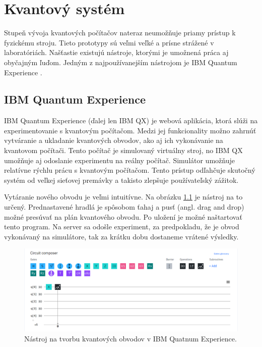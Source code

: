 
\chapter{Kvantový systém}

Stupeň vývoja kvantových počítačov nateraz neumožňuje priamy prístup k
fyzickému stroju. Tieto prototypy sú veľmi veľké a prísne strážené v 
laboratóriách. Našťastie existujú nástroje, ktorými je umožnená práca aj 
obyčajným ľuďom. Jedným z najpoužívanejším nástrojom je IBM Quantum Experience
\cite{IBM}. 

\section{IBM Quantum Experience}
IBM Quantum Experience (ďalej len IBM QX) je webová aplikácia, ktorá 
slúži na experimentovanie s kvantovým počítačom. Medzi jej funkcionality 
možno zahrnúť vytváranie a ukladanie kvantových obvodov, ako aj ich 
vykonávanie na kvantovom počítači. Tento počítač je simulovaný virtuálny 
stroj, no IBM QX umožňuje aj odoslanie experimentu na reálny počítač. 
Simulátor umožňuje relatívne rýchlu prácu s kvantovým počítačom. Tento
prístup odľahčuje skutočný systém od veľkej sieťovej premávky a takisto 
zlepšuje používateľský zážitok.

Vytáranie nového obvodu je veľmi intuitívne. Na obrázku \ref{ibm_qx_composer}
je nástroj na to určený. Prednastavené hradlá je spôsobom ťahaj a pusť (angl.
drag and drop) možné presúvať na plán kvantového obvodu. Po uložení je možné
naštartovať tento program. Na server sa odošle experiment, za predpokladu, že
je obvod vykonávaný na simulátore, tak za krátku dobu dostaneme vrátené 
výsledky.

\begin{figure} 
	\centering 
	\includegraphics[width=1\textwidth]{figures/ibm_qx_composer.png} 
	\caption{Nástroj na tvorbu kvantových obvodov v IBM Quatnum Experience.}
    \label{ibm_qx_composer}
\end{figure}

